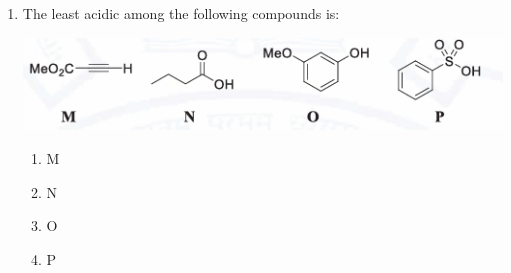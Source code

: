 \documentclass[journal,12pt,onecolumn]{IEEEtran}
\begin{document}
\begin{enumerate}
    \item The least acidic among the following compounds is: 
    \begin{center}
    \includegraphics[width=0.8\columnwidth]{figs/q14.png}
    \end{center}
    \begin{multicols}{2}
    \begin{enumerate}
        \item M
        \item N
        \item O
        \item P
    \end{enumerate}
    \end{multicols}
    \hfill{}
    

\end{enumerate}
\end{document}
